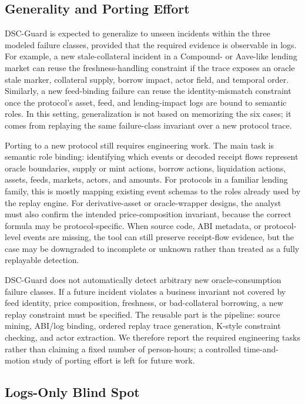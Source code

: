 \documentclass[final,5p]{elsarticle}
\newcommand{\tool}{DSC-Guard\xspace}
\begin{document}
\subsection{Generality and Porting Effort}

\tool is expected to generalize to unseen incidents within the three modeled failure classes, provided that the required evidence is observable in logs.
For example, a new stale-collateral incident in a Compound- or Aave-like lending market can reuse the freshness-handling constraint if the trace exposes an oracle stale marker, collateral supply, borrow impact, actor field, and temporal order.
Similarly, a new feed-binding failure can reuse the identity-mismatch constraint once the protocol's asset, feed, and lending-impact logs are bound to semantic roles.
In this setting, generalization is not based on memorizing the six cases; it comes from replaying the same failure-class invariant over a new protocol trace.

Porting to a new protocol still requires engineering work.
The main task is semantic role binding: identifying which events or decoded receipt flows represent oracle boundaries, supply or mint actions, borrow actions, liquidation actions, assets, feeds, markets, actors, and amounts.
For protocols in a familiar lending family, this is mostly mapping existing event schemas to the roles already used by the replay engine.
For derivative-asset or oracle-wrapper designs, the analyst must also confirm the intended price-composition invariant, because the correct formula may be protocol-specific.
When source code, ABI metadata, or protocol-level events are missing, the tool can still preserve receipt-flow evidence, but the case may be downgraded to incomplete or unknown rather than treated as a fully replayable detection.

\tool does not automatically detect arbitrary new oracle-consumption failure classes.
If a future incident violates a business invariant not covered by feed identity, price composition, freshness, or bad-collateral borrowing, a new replay constraint must be specified.
The reusable part is the pipeline: source mining, ABI/log binding, ordered replay trace generation, K-style constraint checking, and actor extraction.
We therefore report the required engineering tasks rather than claiming a fixed number of person-hours; a controlled time-and-motion study of porting effort is left for future work.

\subsection{Logs-Only Blind Spot}
\end{document}
